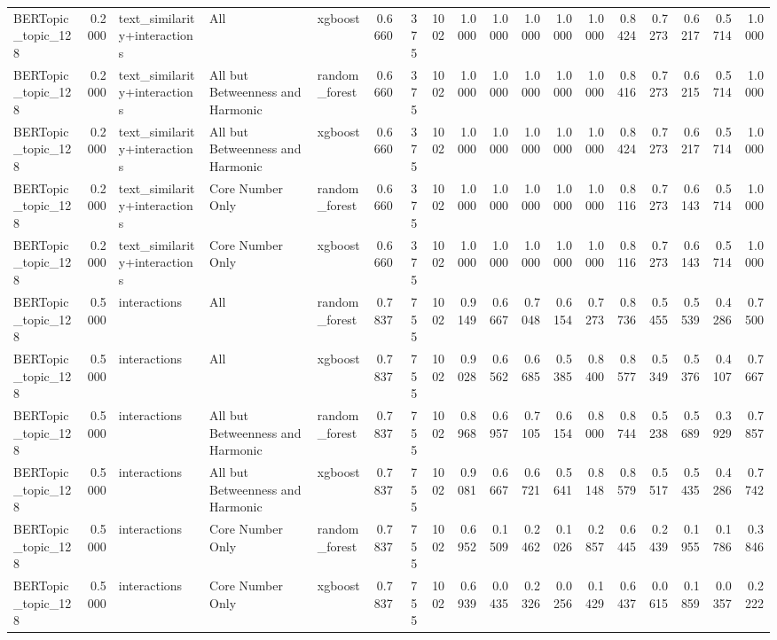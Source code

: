 \begin{tabular}{lrlllrrrrrrrrrrrrr}
BERTopic_topic_128 & 0.2000 & text_similarity+interactions & All & xgboost & 0.6660 & 375 & 1002 & 1.0000 & 1.0000 & 1.0000 & 1.0000 & 1.0000 & 0.8424 & 0.7273 & 0.6217 & 0.5714 & 1.0000 \\
BERTopic_topic_128 & 0.2000 & text_similarity+interactions & All but Betweenness and Harmonic & random_forest & 0.6660 & 375 & 1002 & 1.0000 & 1.0000 & 1.0000 & 1.0000 & 1.0000 & 0.8416 & 0.7273 & 0.6215 & 0.5714 & 1.0000 \\
BERTopic_topic_128 & 0.2000 & text_similarity+interactions & All but Betweenness and Harmonic & xgboost & 0.6660 & 375 & 1002 & 1.0000 & 1.0000 & 1.0000 & 1.0000 & 1.0000 & 0.8424 & 0.7273 & 0.6217 & 0.5714 & 1.0000 \\
BERTopic_topic_128 & 0.2000 & text_similarity+interactions & Core Number Only & random_forest & 0.6660 & 375 & 1002 & 1.0000 & 1.0000 & 1.0000 & 1.0000 & 1.0000 & 0.8116 & 0.7273 & 0.6143 & 0.5714 & 1.0000 \\
BERTopic_topic_128 & 0.2000 & text_similarity+interactions & Core Number Only & xgboost & 0.6660 & 375 & 1002 & 1.0000 & 1.0000 & 1.0000 & 1.0000 & 1.0000 & 0.8116 & 0.7273 & 0.6143 & 0.5714 & 1.0000 \\
BERTopic_topic_128 & 0.5000 & interactions & All & random_forest & 0.7837 & 755 & 1002 & 0.9149 & 0.6667 & 0.7048 & 0.6154 & 0.7273 & 0.8736 & 0.5455 & 0.5539 & 0.4286 & 0.7500 \\
BERTopic_topic_128 & 0.5000 & interactions & All & xgboost & 0.7837 & 755 & 1002 & 0.9028 & 0.6562 & 0.6685 & 0.5385 & 0.8400 & 0.8577 & 0.5349 & 0.5376 & 0.4107 & 0.7667 \\
BERTopic_topic_128 & 0.5000 & interactions & All but Betweenness and Harmonic & random_forest & 0.7837 & 755 & 1002 & 0.8968 & 0.6957 & 0.7105 & 0.6154 & 0.8000 & 0.8744 & 0.5238 & 0.5689 & 0.3929 & 0.7857 \\
BERTopic_topic_128 & 0.5000 & interactions & All but Betweenness and Harmonic & xgboost & 0.7837 & 755 & 1002 & 0.9081 & 0.6667 & 0.6721 & 0.5641 & 0.8148 & 0.8579 & 0.5517 & 0.5435 & 0.4286 & 0.7742 \\
BERTopic_topic_128 & 0.5000 & interactions & Core Number Only & random_forest & 0.7837 & 755 & 1002 & 0.6952 & 0.1509 & 0.2462 & 0.1026 & 0.2857 & 0.6445 & 0.2439 & 0.1955 & 0.1786 & 0.3846 \\
BERTopic_topic_128 & 0.5000 & interactions & Core Number Only & xgboost & 0.7837 & 755 & 1002 & 0.6939 & 0.0435 & 0.2326 & 0.0256 & 0.1429 & 0.6437 & 0.0615 & 0.1859 & 0.0357 & 0.2222 \\

\end{tabular}
